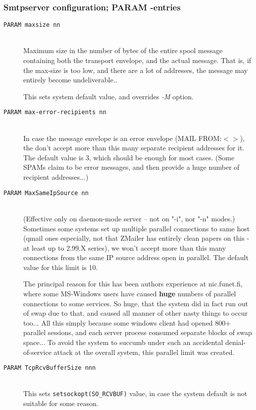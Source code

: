 \subsubsection{Smtpserver configuration; PARAM -entries}


\begin{description}
\item[\tt PARAM maxsize nn] \mbox{} \\
Maximum size in the number of bytes of the entire spool message
containing both the transport envelope, and the actual message.
That is, if the max-size is too low, and there are a lot of
addresses, the message may entirely become undeliverable..

This sets system default value, and overrides {\em -M} option.

\item[\tt PARAM max-error-recipients nn] \mbox{} \\
In case the message envelope is an error envelope (MAIL FROM:{\(<>\)}),
the don't accept more than this many separate recipient addresses
for it. The default value is 3, which should be enough for most cases.
(Some SPAMs claim to be error messages, and then provide a huge
number of recipient addresses...)

\item[\tt PARAM MaxSameIpSource nn] \mbox{} \\
(Effective only on daemon-mode server -- not on "-i", nor "-n" modes.)
Sometimes some systems set up multiple parallel connections to same
host  (qmail ones especially, not that ZMailer has entirely clean
papers on this - at least up to 2.99.X series), we won't accept
more than this many connections from the same IP source address
open in parallel.  The default value for this limit is 10.

The principal reason for this has been authors experience at nic.funet.fi,
where some MS-Windows users have caused {\bf huge} numbers
of parallel connections to some services.  So huge, that the system
did in fact run out of swap due to that, and caused all manner of
other nasty things to occur too...  All this simply because some
windows client had opened 800+ parallel sessions, and each server
process consumed separate blocks of swap space...  To avoid the
system to succumb under such an accidental denial-of-service attack
at the overall system, this parallel limit was created.


\item[\tt PARAM TcpRcvBufferSize nnn] \mbox{} \\
This sets {\tt setsockopt(SO\_RCVBUF)} value, 
in case the system default is not suitable for some reason.


\end{description}
